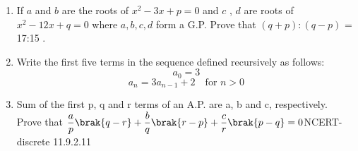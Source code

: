 \begin{enumerate}[label=\thesection.\arabic*,ref=\thesection.\theenumi]
\item If $a$ and $b$ are the roots of $x^{2} -3x + p = 0$ and $c$ , $d$ are roots of $x^{2} - 12x + q = 0$ where $a,b,c,d$ form a G.P. Prove that $(q+p) : (q-p)$ = 17:15 .\\
\solution
\pagebreak

\item Write the first five terms in the sequence defined recursively as follows:
\[ a_{0} = 3 \]
\[ a_{n} = 3a_{n-1} + 2 \quad \text{for } n > 0 \]
\solution 
\pagebreak

\item Sum of the first p, q and r terms of an A.P. are a, b and c, respectively.\\
Prove that $\dfrac{a}{p}\brak{q-r}+\dfrac{b}{q}\brak{r-p}+\dfrac{c}{r}\brak{p-q}=0$\hfill{NCERT-discrete 11.9.2.11}\\
\solution

\pagebreak
\end{enumerate}
